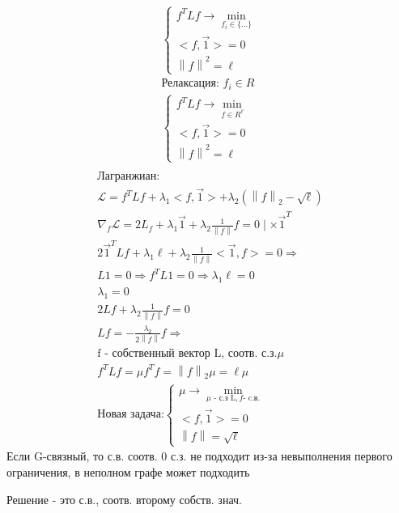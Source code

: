\documentclass[a4paper, 12pt]{article}
\newcommand\norm[1]{\left\lVert#1\right\rVert}
\begin{document}
\begin{gather*}
    \begin{cases}
        f^TLf \rightarrow \min_{f_i \in \{\ldots\}} \\
        <f, \vec{1}> = 0 \\
        \norm{f}^2 = \ell
    \end{cases} \\
    \textrm{Релаксация: } f_i \in R \\
    \begin{cases}
        f^TLf \rightarrow \min_{f \in R^{\ell}} \\
        <f, \vec{1}> = 0 \\
        \norm{f}^2 = \ell
    \end{cases} \\
\end{gather*}
\begin{gather*}
    \textrm{Лагранжиан:} \\
    \mathcal{L} = f^TLf + \lambda_1<f, \vec{1}> + 
    \lambda_2(\norm{f}_2 - \sqrt{\ell}) \\
    \nabla_f \mathcal{L} = 2L_f + 
    \lambda_1 \vec{1} +
    \lambda_2 \frac{1}{\norm{f}}f = 0 \mid \times \vec{1}^T \\
    2 \vec{1}^TLf + \lambda_1 \ell + 
    \lambda_2 \frac{1}{\norm{f}}<\vec{1}, f> = 0 \Rightarrow\\
    L1 = 0 \Rightarrow f^TL1 = 0 \Rightarrow \lambda_1 \ell = 0 \\
    \lambda_1 = 0 \\
    2Lf + \lambda_2 \frac{1}{\norm{f}}f = 0 \\
    Lf = -\frac{\lambda_2}{2\norm{f}}f \Rightarrow \\
    \textrm{f - собственный вектор L, соотв. с.з.} \mu \\
    f^TLf = \mu f^Tf = \norm{f}_{2}\mu = \ell \mu \\
    \textrm{Новая задача:}
    \begin{cases}
        \mu \rightarrow \min_{\mu \textrm{ - с.з L}, 
        f \textrm{- c.в.}} \\
        <f, \vec{1}> = 0 \\
        \norm{f} = \sqrt{\ell}
    \end{cases}
\end{gather*}
Если G-связный, то с.в. соотв. 0 с.з. не подходит
из-за невыполнения первого ограничения, в неполном графе
может подходить

Решение - это с.в., соотв. второму собств. знач.
\end{document}
